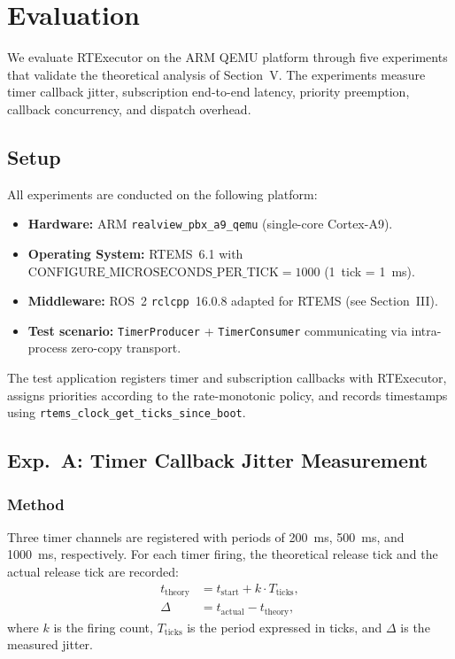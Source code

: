 \section{Evaluation}

We evaluate RTExecutor on the ARM QEMU platform through five experiments that validate the theoretical analysis of Section~V.
The experiments measure timer callback jitter, subscription end-to-end latency, priority preemption, callback concurrency, and dispatch overhead.

\subsection{Setup}

All experiments are conducted on the following platform:
\begin{itemize}
    \item \textbf{Hardware:} ARM \texttt{realview\_pbx\_a9\_qemu} (single-core Cortex-A9).
    \item \textbf{Operating System:} RTEMS~6.1 with $\text{CONFIGURE\_MICROSECONDS\_PER\_TICK} = 1000$ (1~tick = 1~ms).
    \item \textbf{Middleware:} ROS~2 \texttt{rclcpp}~16.0.8 adapted for RTEMS (see Section~III).
    \item \textbf{Test scenario:} \texttt{TimerProducer} + \texttt{TimerConsumer} communicating via intra-process zero-copy transport.
\end{itemize}
The test application registers timer and subscription callbacks with RTExecutor, assigns priorities according to the rate-monotonic policy, and records timestamps using \texttt{rtems\_clock\_get\_ticks\_since\_boot}.

\subsection{Exp.\ A: Timer Callback Jitter Measurement}

\subsubsection{Method}

Three timer channels are registered with periods of 200~ms, 500~ms, and 1000~ms, respectively.
For each timer firing, the theoretical release tick and the actual release tick are recorded:
\begin{align}
    t_{\mathrm{theory}} &= t_{\mathrm{start}} + k \cdot T_{\mathrm{ticks}}, \\
    \Delta &= t_{\mathrm{actual}} - t_{\mathrm{theory}},
\end{align}
where $k$ is the firing count, $T_{\mathrm{ticks}}$ is the period expressed in ticks, and $\Delta$ is the measured jitter.


